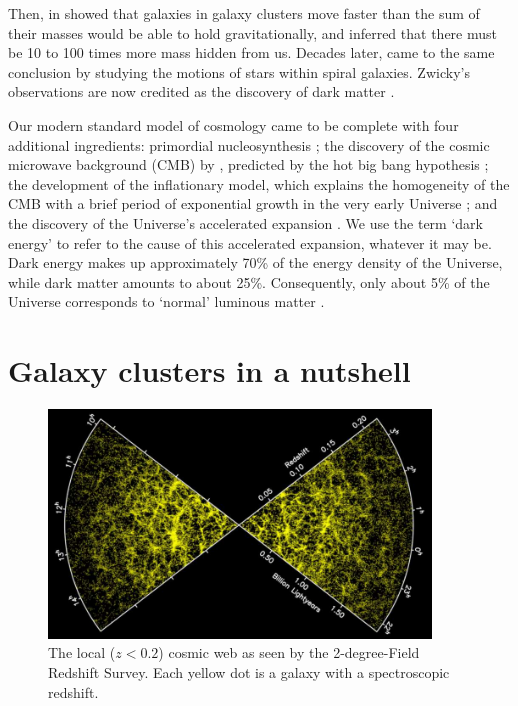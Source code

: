 Then, in \citeyear{zwicky33} \citeauthor{zwicky33} showed that galaxies in galaxy clusters move faster than the sum of their masses would be able to hold gravitationally, and inferred that there must be 10 to 100 times more mass hidden from us. Decades later, \cite{rubin80} came to the same conclusion by studying the motions of stars within spiral galaxies. Zwicky's observations are now credited as the discovery of dark matter \citep[e.g.,][]{trimble87,einasto13}.

Our modern standard model of cosmology came to be complete with four additional ingredients: primordial nucleosynthesis \citep[the theory that the lightest chemical elements formed during the big bang;][]{alpher48}; the discovery of the cosmic microwave background (CMB) by \cite{penzias65}, predicted by the hot big bang hypothesis \citep{dicke65}; the development of the inflationary model, which explains the homogeneity of the CMB with a brief period of exponential growth in the very early Universe \citep{guth81}; and the discovery of the Universe's accelerated expansion \citep{riess98,perlmutter99}. We use the term `dark energy' to refer to the cause of this accelerated expansion, whatever it may be. Dark energy makes up approximately 70\% of the energy density of the Universe, while dark matter amounts to about 25\%. Consequently, only about 5\% of the Universe corresponds to `normal' luminous matter \citep{planck15xiii}.


\section{Galaxy clusters in a nutshell}

\begin{figure}
 \centerline{\includegraphics[width=4in]{chapter1/web_2df.jpg}}
\caption{The local ($z<0.2$) cosmic web as seen by the 2-degree-Field Redshift Survey. Each yellow dot is a galaxy with a spectroscopic redshift.}
\label{f:intro_web}
\end{figure}

